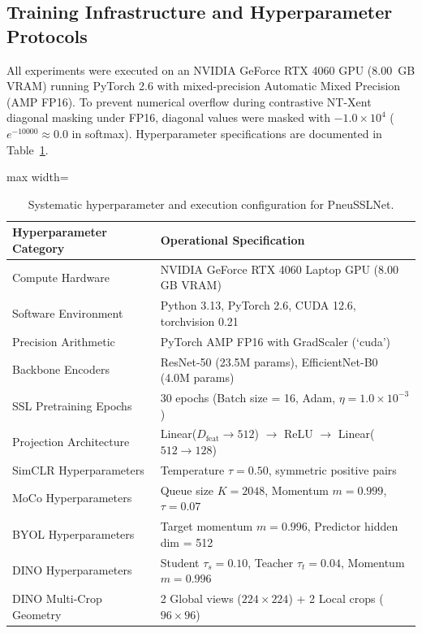 \documentclass[journal,article,submit,moreauthors,pdftex]{Definitions/tsp}
\begin{document}
\subsection{Training Infrastructure and Hyperparameter Protocols} \label{sect:s3dot7}
All experiments were executed on an NVIDIA GeForce RTX 4060 GPU (8.00~GB VRAM) running PyTorch 2.6 with mixed-precision Automatic Mixed Precision (AMP FP16). To prevent numerical overflow during contrastive NT-Xent diagonal masking under FP16, diagonal values were masked with $-1.0 \times 10^4$ ($e^{-10000} \approx 0.0$ in softmax). Hyperparameter specifications are documented in Table~\ref{tab:hyperparameters}.

\begin{table}[htbp]
\tablesize{\scriptsize}
\centering
\caption{Systematic hyperparameter and execution configuration for PneuSSLNet.}
\label{tab:hyperparameters}
\begin{threeparttable}
\begin{adjustbox}{max width=\columnwidth}
\begin{tabular}{p{3.2cm} p{4.8cm}}
\toprule
\textbf{Hyperparameter Category} & \textbf{Operational Specification} \\
\midrule
Compute Hardware & NVIDIA GeForce RTX 4060 Laptop GPU (8.00 GB VRAM) \\
Software Environment & Python 3.13, PyTorch 2.6, CUDA 12.6, torchvision 0.21 \\
Precision Arithmetic & PyTorch AMP FP16 with GradScaler (`cuda') \\
Backbone Encoders & ResNet-50 (23.5M params), EfficientNet-B0 (4.0M params) \\
SSL Pretraining Epochs & 30 epochs (Batch size = 16, Adam, $\eta = 1.0 \times 10^{-3}$) \\
Projection Architecture & Linear($D_{\text{feat}} \to 512$) $\to$ ReLU $\to$ Linear($512 \to 128$) \\
SimCLR Hyperparameters & Temperature $\tau = 0.50$, symmetric positive pairs \\
MoCo Hyperparameters & Queue size $K = 2048$, Momentum $m = 0.999$, $\tau = 0.07$ \\
BYOL Hyperparameters & Target momentum $m = 0.996$, Predictor hidden dim = 512 \\
DINO Hyperparameters & Student $\tau_s = 0.10$, Teacher $\tau_t = 0.04$, Momentum $m = 0.996$ \\
DINO Multi-Crop Geometry & 2 Global views ($224 \times 224$) + 2 Local crops ($96 \times 96$) \\

\end{tabular}
\end{adjustbox}
\end{threeparttable}
\end{table}
\end{document}
